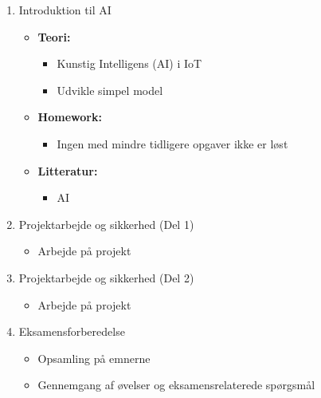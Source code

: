 \documentclass[12pt,a4paper]{article}
\begin{document}
\begin{enumerate}[leftmargin=*, label=\textbf{Dag \arabic* (3 timer)}]
	\item Introduktion til AI
	\begin{itemize}
		\item \textbf{Teori:}
		\begin{itemize}
			\item Kunstig Intelligens (AI) i IoT
			\item Udvikle simpel model
		\end{itemize}
		\item  \textbf{Homework:}
		\begin{itemize}
			\item Ingen med mindre tidligere opgaver ikke er løst
		\end{itemize}
		\item \textbf{Litteratur:}
		\begin{itemize}
			\item AI
		\end{itemize}
	\end{itemize}

	\item Projektarbejde og sikkerhed (Del 1)
	\begin{itemize}
		\item Arbejde på projekt
	\end{itemize}
	
	\item Projektarbejde og sikkerhed (Del 2)
	\begin{itemize}
		\item Arbejde på projekt
	\end{itemize}

	\item Eksamensforberedelse
	\begin{itemize}
		\item Opsamling på emnerne
		\item Gennemgang af øvelser og eksamensrelaterede spørgsmål
	\end{itemize}	
\end{enumerate}
\end{document}
